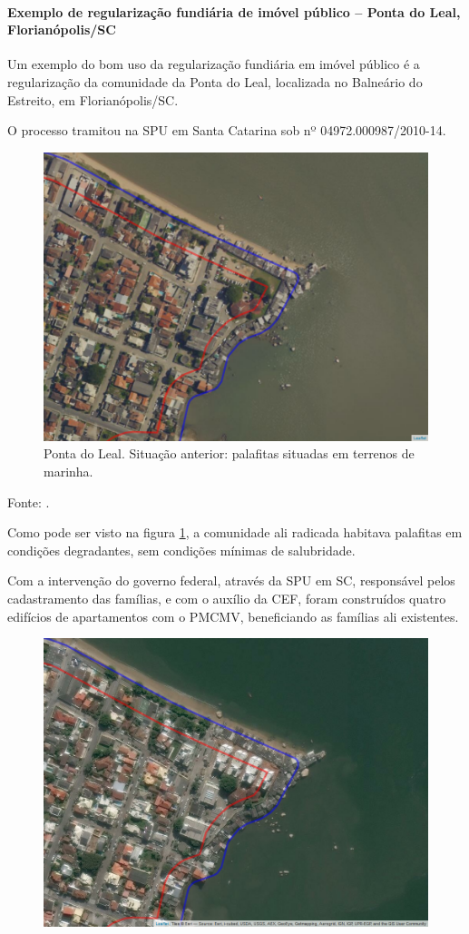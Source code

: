 \documentclass[
	12pt,				%
	oneside,			%
	a4paper,			%
	chapter=TITLE,		%
	section=TITLE,		%
	english,			%
	brazil				%
	]{abntex2}
\newcommand{\bcenter}{\begin{center}}
\newcommand{\ecenter}{\end{center}}
\begin{document}
\begin{refsection}
{\paragraph{Exemplo de regularização fundiária de imóvel público -- Ponta do Leal, Florianópolis/SC}\label{exemplo-de-regularizauxe7uxe3o-fundiuxe1ria-de-imuxf3vel-puxfablico-ponta-do-leal-florianuxf3polissc}}

Um exemplo do bom uso da regularização fundiária em imóvel público é a
regularização da comunidade da Ponta do Leal, localizada no Balneário do
Estreito, em Florianópolis/SC.

O processo tramitou na \gls{SPU} em Santa Catarina sob nº 04972.000987/2010-14.
\begin{figure}[H]

{\centering \includegraphics[width=0.7\linewidth]{images/ponta-leal-antes} 

}

\caption{Ponta do Leal. Situação anterior: palafitas situadas em terrenos de marinha.}\label{fig:ponta-leal-antes}
\end{figure}
\bcenter

Fonte: \textcite{sigsc}.
\ecenter

Como pode ser visto na figura \ref{fig:ponta-leal-antes}, a comunidade ali
radicada habitava palafitas em condições degradantes, sem condições mínimas de
salubridade.

Com a intervenção do governo federal, através da \gls{SPU} em SC, responsável
pelos cadastramento das famílias, e com o auxílio da \gls{CEF}, foram
construídos quatro edifícios de apartamentos com o \gls{PMCMV}, beneficiando as
famílias ali existentes.
\begin{figure}[H]

{\centering \includegraphics[width=0.7\linewidth]{images/ponta-leal-depois} 

}
\end{figure}
\end{refsection}
\end{document}
